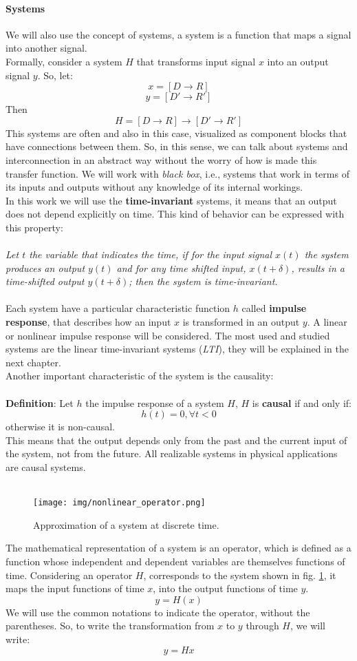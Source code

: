 \paragraph{Systems}
We will also use the concept of systems, a system is a function that maps a signal into another signal.\\ 
Formally, consider a system $H$ that transforms input signal $x$ into an output signal $y$. So, let:
\[ x = [D \rightarrow R] \]
\[ y = [D' \rightarrow R'] \]
Then
\[ H = [D \rightarrow R] \rightarrow [D' \rightarrow R'] \]
This systems are often and also in this case, visualized as component blocks that have connections between them. So, in this sense, we can talk about systems and interconnection in an abstract way without the worry of how is made this transfer function. We will work with \textit{black box}, i.e., systems that work in terms of its inputs and outputs without any knowledge of its internal workings.\\
In this work we will use the \textbf{time-invariant} systems, it means that an output does not depend explicitly on time. This kind of behavior can be expressed with this property:\\\\
\textit{
Let $t$ the variable that indicates the time, if for the input signal $x(t)$ the system produces an output $y(t)$ and for any time shifted input, $x(t + \delta)$, results in a time-shifted output $y(t + \delta)$; then the system is time-invariant.}\\\\
Each system have a particular characteristic function $h$ called \textbf{impulse response}, that describes how an input $x$ is transformed in an output $y$. A linear or nonlinear impulse response will be considered. The most used and studied systems are the linear time-invariant systems (\textit{LTI}), they will be explained in the next chapter.\\
Another important characteristic of the system is the causality:\\\\
\textbf{Definition}: Let $h$ the impulse response of a system $H$, $H$ is \textbf{causal} if and only if:
\[ h(t) = 0, \forall t<0 \]
otherwise it is non-causal.\\
This means that the output depends only from the past and the current input of the system, not from the future. All realizable systems in physical applications are causal systems.\\\\
\begin{figure}[h]\centering
\texttt{[image: img/nonlinear\_operator.png]} 
\caption{Approximation of a system at discrete time.} \label{fig:nonlinearoperator}
\end{figure}
The mathematical representation of a system is an operator, which is defined as a function whose independent and dependent variables are themselves functions of time.
Considering an operator $H$,  corresponds to the system shown in fig. \ref{fig:nonlinearoperator}, it maps the input functions of time $x$, into the output functions of time $y$.
\[ y = H(x) \]
We will use the common notations to indicate the operator, without the parentheses. So, to write the transformation from $x$ to $y$ through $H$, we will write:  \[y=Hx\]
